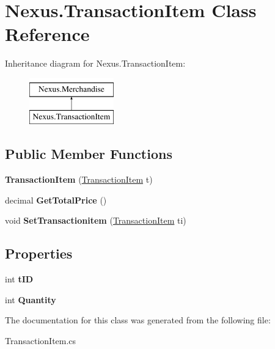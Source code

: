 \hypertarget{class_nexus_1_1_transaction_item}{}\section{Nexus.\+Transaction\+Item Class Reference}
\label{class_nexus_1_1_transaction_item}
Inheritance diagram for Nexus.\+Transaction\+Item\+:\begin{figure}[H]
\begin{center}
\leavevmode
\includegraphics[height=2.000000cm]{class_nexus_1_1_transaction_item}
\end{center}
\end{figure}
\subsection*{Public Member Functions}
\begin{DoxyCompactItemize}
\item 
\mbox{\label{class_nexus_1_1_transaction_item_a823d225c086561cce31afcdc88e4ed06}} 
{\bfseries Transaction\+Item} (\mbox{\hyperlink{class_nexus_1_1_transaction_item}{Transaction\+Item}} t)
\item 
\mbox{\label{class_nexus_1_1_transaction_item_af4ff8dde9340d05a5b19a3286a29c596}} 
decimal {\bfseries Get\+Total\+Price} ()
\item 
\mbox{\label{class_nexus_1_1_transaction_item_a0fd2facc0cf4f468913c9c1667f9d74e}} 
void {\bfseries Set\+Transactionitem} (\mbox{\hyperlink{class_nexus_1_1_transaction_item}{Transaction\+Item}} ti)
\end{DoxyCompactItemize}
\subsection*{Properties}
\begin{DoxyCompactItemize}
\item 
\mbox{\label{class_nexus_1_1_transaction_item_a31a50adfd35c5fc5f1c5f33f36c39af3}} 
int {\bfseries t\+ID}
\item 
\mbox{\label{class_nexus_1_1_transaction_item_a374b3e2bac84c643a9d9c222927a4b53}} 
int {\bfseries Quantity}
\end{DoxyCompactItemize}


The documentation for this class was generated from the following file\+:\begin{DoxyCompactItemize}
\item 
Transaction\+Item.\+cs\end{DoxyCompactItemize}
